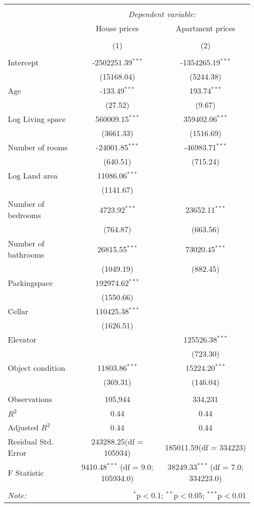 \begin{table}[!htbp] \centering
\begin{tabular}{@{\extracolsep{5pt}}lcc}
\\[-1.8ex]\hline
\hline \\[-1.8ex]
& \multicolumn{2}{c}{\textit{Dependent variable:}} \
\cr \cline{2-3}
\\[-1.8ex] & \multicolumn{1}{c}{House prices} & \multicolumn{1}{c}{Apartment prices}  \\
\\[-1.8ex] & (1) & (2) \\
\hline \\[-1.8ex]
 Intercept & -2502251.39$^{***}$ & -1354265.19$^{***}$ \\
  & (15168.04) & (5244.38) \\
 Age & -133.49$^{***}$ & 193.74$^{***}$ \\
  & (27.52) & (9.67) \\
 Log Living space & 560009.15$^{***}$ & 359402.06$^{***}$ \\
  & (3661.33) & (1516.69) \\
 Number of rooms & -24001.85$^{***}$ & -46983.71$^{***}$ \\
  & (640.51) & (715.24) \\
 Log Land area & 11086.06$^{***}$ & \\
  & (1141.67) & \\
 Number of bedrooms & 4723.92$^{***}$ & 23652.11$^{***}$ \\
  & (764.87) & (663.56) \\
 Number of bathrooms & 26815.55$^{***}$ & 73020.45$^{***}$ \\
  & (1049.19) & (882.45) \\
 Parkingspace & 192974.62$^{***}$ & \\
  & (1550.66) & \\
 Cellar & 110425.38$^{***}$ & \\
  & (1626.51) & \\
 Elevator & & 125526.38$^{***}$ \\
  & & (723.30) \\
 Object condition & 11803.86$^{***}$ & 15224.20$^{***}$ \\
  & (369.31) & (146.04) \\
\hline \\[-1.8ex]
 Observations & 105,944 & 334,231 \\
 $R^2$ & 0.44 & 0.44 \\
 Adjusted $R^2$ & 0.44 & 0.44 \\
 Residual Std. Error & 243288.25(df = 105934) & 185011.59(df = 334223)  \\
 F Statistic & 9410.48$^{***}$ (df = 9.0; 105934.0) & 38249.33$^{***}$ (df = 7.0; 334223.0) \\
\hline
\hline \\[-1.8ex]
\textit{Note:} & \multicolumn{2}{r}{$^{*}$p$<$0.1; $^{**}$p$<$0.05; $^{***}$p$<$0.01} \\
\end{tabular}
\end{table}